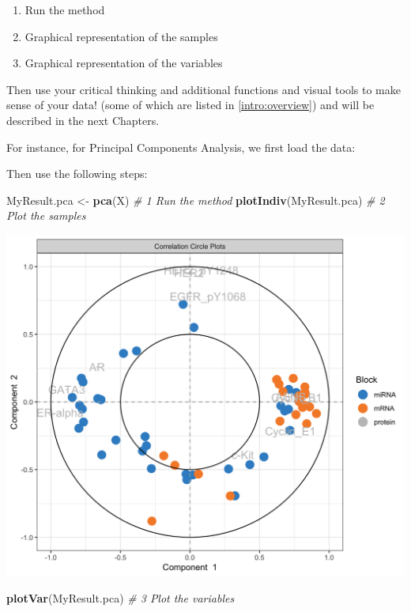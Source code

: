 \documentclass[]{book}
\newenvironment{Shaded}{\begin{snugshade}}{\end{snugshade}}
\newcommand{\KeywordTok}[1]{\textcolor[rgb]{0.13,0.29,0.53}{\textbf{#1}}}
\newcommand{\StringTok}[1]{\textcolor[rgb]{0.31,0.60,0.02}{#1}}
\newcommand{\CommentTok}[1]{\textcolor[rgb]{0.56,0.35,0.01}{\textit{#1}}}
\newcommand{\OperatorTok}[1]{\textcolor[rgb]{0.81,0.36,0.00}{\textbf{#1}}}
\newcommand{\NormalTok}[1]{#1}
\providecommand{\tightlist}{%
  \setlength{\itemsep}{0pt}\setlength{\parskip}{0pt}}
\theoremstyle{definition}
\theoremstyle{definition}
\theoremstyle{definition}
\theoremstyle{remark}
\begin{document}
\begin{enumerate}
\def\labelenumi{\arabic{enumi}.}
\tightlist
\item
  Run the method
\item
  Graphical representation of the samples
\item
  Graphical representation of the variables
\end{enumerate}

Then use your critical thinking and additional functions and visual
tools to make sense of your data! (some of which are listed in
\ref{intro:overview}) and will be described in the next Chapters.

For instance, for Principal Components Analysis, we first load the data:

\begin{Shaded}
\end{Shaded}

Then use the following steps:

\begin{Shaded}
\begin{Highlighting}[]
\NormalTok{MyResult.pca <-}\StringTok{ }\KeywordTok{pca}\NormalTok{(X)  }\CommentTok{# 1 Run the method}
\KeywordTok{plotIndiv}\NormalTok{(MyResult.pca) }\CommentTok{# 2 Plot the samples}
\end{Highlighting}
\end{Shaded}

\begin{center}\includegraphics[width=0.5\linewidth]{Figures/unnamed-chunk-5-1} \end{center}

\begin{Shaded}
\begin{Highlighting}[]
\KeywordTok{plotVar}\NormalTok{(MyResult.pca)   }\CommentTok{# 3 Plot the variables}
\end{Highlighting}
\end{Shaded}
\end{document}
